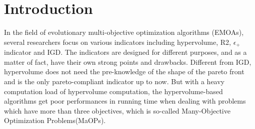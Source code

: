 \documentclass[conference]{IEEEtran}
\begin{document}
% 
\section{Introduction}
In the field of evolutionary multi-objective optimization algorithms (EMOAs), 
several researchers focus on various indicators including hypervolume\cite{hypervolume}, R2\cite{R2}, $\epsilon_+$ indicator\cite{e+} and IGD\cite{IGD}.
The indicators are designed for different purposes, and as a matter of fact, 
have their own strong points and drawbacks. Different from IGD, 
hypervolume does not need the pre-knowledge of the shape of the pareto front 
and is the only pareto-compliant indicator up to now\cite{pareto_compliant}. 
But with a heavy computation load of hypervolume computation\cite{hypervolume:computationLoad}, 
the hypervolume-based algorithms get poor performances 
in running time when dealing with problems which have more than three objectives, 
which is so-called Many-Objective Optimization Problems(MaOPs). 
\end{document}
